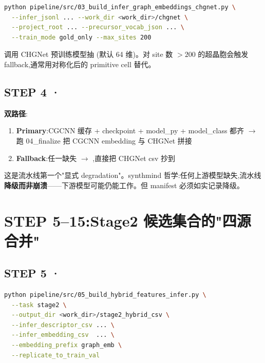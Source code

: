 \begin{lstlisting}[language=bash]
python pipeline/src/03_build_infer_graph_embeddings_chgnet.py \
  --infer_jsonl ... --work_dir <work_dir>/chgnet \
  --project_root ... --precursor_vocab_json ... \
  --train_mode gold_only --max_sites 200
\end{lstlisting}

调用 CHGNet 预训练模型抽 (默认 64 维)。对 site 数 $> 200$ 的超晶胞会触发 fallback,通常用对称化后的 primitive cell 替代。

\subsection{STEP 4 · }

\textbf{双路径}:
\begin{enumerate}
    \item \textbf{Primary}:CGCNN 缓存 + checkpoint + model\_py + model\_class 都齐 $\to$ 跑 04\_finalize 把 CGCNN embedding 与 CHGNet 拼接
    \item \textbf{Fallback}:任一缺失 $\to$ ,直接把 CHGNet csv 抄到 
\end{enumerate}

\begin{repobox}[可重复要点 \#3]
这是流水线第一个"显式 degradation"。synthmind 哲学:任何上游模型缺失,流水线\textbf{降级而非崩溃}——下游模型可能仍能工作。但 manifest 必须如实记录降级。
\end{repobox}

\section{STEP 5--15:Stage2 候选集合的"四源合并"}

\subsection{STEP 5 · \code{build\_stage2\_features}}

\begin{lstlisting}[language=bash]
python pipeline/src/05_build_hybrid_features_infer.py \
  --task stage2 \
  --output_dir <work_dir>/stage2_hybrid_csv \
  --infer_descriptor_csv ... \
  --infer_embedding_csv  ... \
  --embedding_prefix graph_emb \
  --replicate_to_train_val
\end{lstlisting}

